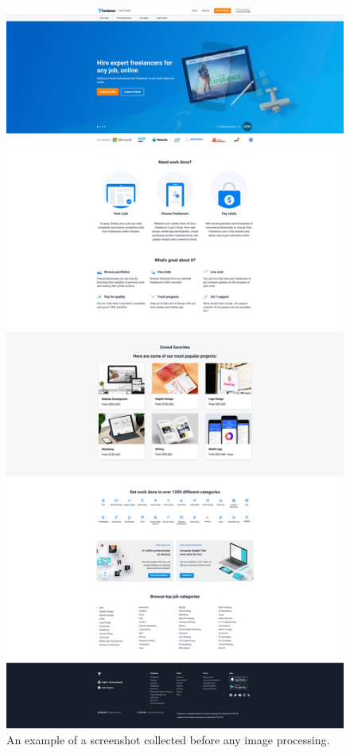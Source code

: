 \documentclass[conference]{IEEEtran}
\begin{document}
\begin{figure}[h]
\centering
\label{fig:rgb}
\includegraphics[width=\columnwidth]{media/freelancer_com_original.png}
\caption{An example of a screenshot collected before any image processing.}
\end{figure}
\end{document}

